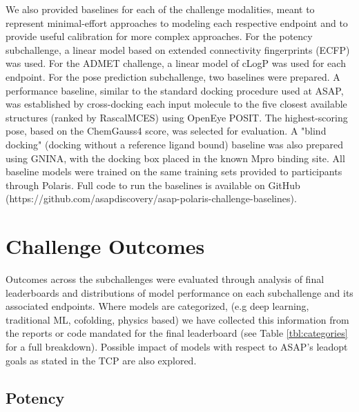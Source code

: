 \documentclass[journal=jcim,manuscript=article]{achemso}
\begin{document}
We also provided baselines for each of the challenge modalities, meant to represent minimal-effort approaches to modeling each respective endpoint and to provide useful calibration for more complex approaches. For the potency subchallenge, a linear model based on extended connectivity fingerprints (ECFP)\cite{ecfp_2010} was used. For the ADMET challenge, a linear model of cLogP\cite{clogp_1999} was used for each endpoint. For the pose prediction subchallenge, two baselines were prepared. A performance baseline, similar to the standard docking procedure used at ASAP, was established by cross-docking each input molecule to the five closest available structures (ranked by RascalMCES\cite{raymond_rascal_2002, rdkit}) using OpenEye POSIT\cite{kelley_posit_2015}. The highest-scoring pose, based on the ChemGauss4\cite{oetk} score, was selected for evaluation. A "blind docking" (docking without a reference ligand bound) baseline was also prepared using GNINA\cite{mcnutt_gnina_2025}, with the docking box placed in the known Mpro binding site. All baseline models were trained on the same training sets provided to participants through Polaris. Full code to run the baselines is available on GitHub (https://github.com/asapdiscovery/asap-polaris-challenge-baselines).

\section{Challenge Outcomes}

Outcomes across the subchallenges were evaluated through analysis of final leaderboards and distributions of model performance on each subchallenge and its associated endpoints. Where models are categorized, (e.g deep learning, traditional ML, cofolding, physics based) we have collected this information from the reports or code mandated for the final leaderboard (see Table \ref{tbl:categories} for a full breakdown). Possible impact of models with respect to ASAP's leadopt goals as stated in the TCP\cite{sars_mers_tcp} are also explored. 

\subsection{Potency}
\end{document}
